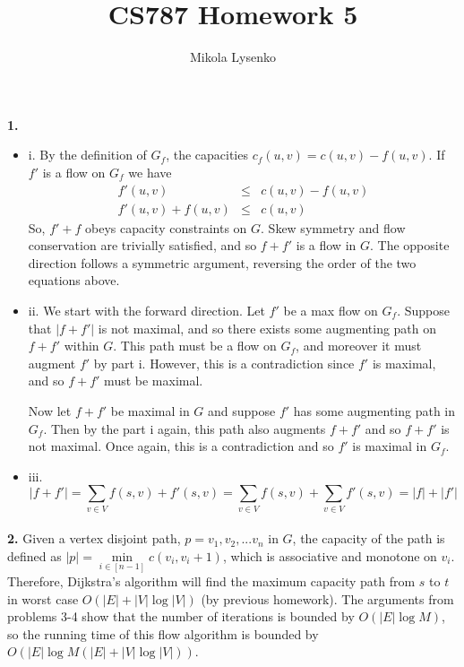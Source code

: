\documentclass{article}
\title{CS787 Homework 5}
\author{Mikola Lysenko}
\begin{document}
\maketitle{}

\paragraph{} \textbf{1.}
\begin{itemize}
\item{i.} By the definition of $G_f$, the capacities $c_f(u,v) = c(u,v) - f(u,v)$.  If $f'$ is a flow on $G_f$ we have
\begin{eqnarray*}
f'(u,v) & \leq & c(u,v) - f(u,v) \\
f'(u,v) + f(u,v) & \leq & c(u,v)
\end{eqnarray*}
So, $f' + f$ obeys capacity constraints on $G$.  Skew symmetry and flow conservation are trivially satisfied, and so $f+f'$ is a flow in $G$.  The opposite direction follows a symmetric argument, reversing the order of the two equations above.

\item{ii.}
We start with the forward direction.  Let $f'$ be a max flow on $G_f$.  Suppose that $|f + f'|$ is not maximal, and so there exists some augmenting path on $f + f'$ within $G$.  This path must be a flow on $G_f$, and moreover it must augment $f'$ by part i.  However, this is a contradiction since $f'$ is maximal, and so $f + f'$ must be maximal.

Now let $f + f'$ be maximal in $G$ and suppose $f'$ has some augmenting path in $G_f$.  Then by the part i again, this path also augments $f + f'$ and so $f + f'$ is not maximal.  Once again, this is a contradiction and so $f'$ is maximal in $G_f$.

\item{iii.}
\[ |f + f'| = \sum \limits_{v \in V} f(s, v) + f'(s, v) = \sum \limits_{v \in V} f(s, v) + \sum \limits_{v \in V} f'(s,v) = |f| + |f'| \]
\end{itemize}

\paragraph{} \textbf{2.}
Given a vertex disjoint path, $p = v_1, v_2, ... v_n$ in $G$, the capacity of the path is defined as $|p| = \min \limits_{i \in [n-1]} c(v_i, v_i+1)$, which is associative and monotone on $v_i$.  Therefore, Dijkstra's algorithm will find the maximum capacity path from $s$ to $t$ in worst case $O( |E| + |V| \log{ |V| } )$ (by previous homework).  The arguments from problems 3-4 show that the number of iterations is bounded by $O(|E| \log{M})$, so the running time of this flow algorithm is bounded by $O(|E| \log{M} (|E| + |V| \log{|V|}))$.  
\end{document}
